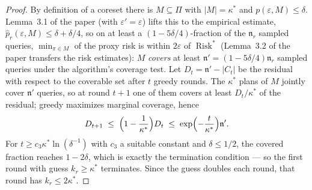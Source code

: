 \begin{proof}
By definition of a coreset there is $M\subseteq\Pi$ with $|M|=\kappa^{*}$ and
$p(\varepsilon,M)\le\delta$. Lemma~3.1 of the paper (with $\varepsilon'=\varepsilon$)
lifts this to the empirical estimate, $\widehat{p}_r(\varepsilon,M) \le
\delta+\delta/4$, so on at least a $(1-5\delta/4)$-fraction of the
$\mathfrak{n}_r$ sampled queries, $\min_{\pi\in M}$ of the proxy risk is within
$2\varepsilon$ of $\operatorname{Risk}^{*}$ (Lemma~3.2 of the paper transfers the
risk estimates): $M$ \emph{covers} at least $\mathfrak{n}' = (1-5\delta/4)\mathfrak{n}_r$
sampled queries under the algorithm's coverage test. Let $D_t = \mathfrak{n}'-|C_t|$
be the residual with respect to the coverable set after $t$ greedy rounds. The
$\kappa^{*}$ plans of $M$ jointly cover $\mathfrak{n}'$ queries, so at round $t+1$ one
of them covers at least $D_t/\kappa^{*}$ of the residual; greedy maximizes marginal
coverage, hence
\[
D_{t+1} \;\le\; \Bigl(1-\frac{1}{\kappa^{*}}\Bigr)D_t \;\le\;
\exp\Bigl(-\frac{t}{\kappa^{*}}\Bigr)\mathfrak{n}'.
\]
For $t \ge c_3\kappa^{*}\ln(\delta^{-1})$ with $c_3$ a suitable constant and
$\delta\le 1/2$, the covered fraction reaches $1-2\delta$, which is exactly the
termination condition --- so the first round with guess $k_r \ge \kappa^{*}$
terminates. Since the guess doubles each round, that round has $k_r \le
2\kappa^{*}$.
\end{proof}



